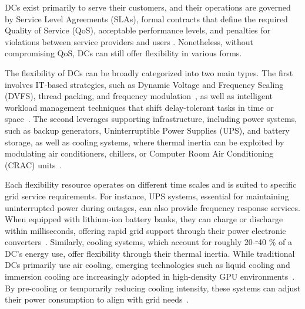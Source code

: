 \documentclass[preprint,12pt]{elsarticle}
\makeatletter
\providecommand{\DIFdeltex}[1]{{\protect\color{red}\sout{#1}}} %
\providecommand{\DIFdelbegin}{} %
\providecommand{\DIFdelend}{} %
\providecommand{\DIFdel}[1]{\texorpdfstring{\DIFdeltex{#1}}{}} %
\providecommand{\DIFscaledelfig}{0.5}
\newlength{\DIFdelgraphicswidth} %
\newlength{\DIFdelgraphicsheight} %
\providecommand{\DIFdelincludegraphics}[2][]{%
\sbox{\DIFdelgraphicsbox}{\DIFOincludegraphics[#1]{#2}}%
\settoboxwidth{\DIFdelgraphicswidth}{\DIFdelgraphicsbox} %
\settoboxtotalheight{\DIFdelgraphicsheight}{\DIFdelgraphicsbox} %
\scalebox{\DIFscaledelfig}{%
\parbox[b]{\DIFdelgraphicswidth}{\usebox{\DIFdelgraphicsbox}\\[-\baselineskip] \rule{\DIFdelgraphicswidth}{0em}}\llap{\resizebox{\DIFdelgraphicswidth}{\DIFdelgraphicsheight}{%
\setlength{\unitlength}{\DIFdelgraphicswidth}%
\begin{picture}(1,1)%
\thicklines\linethickness{2pt} %
{\color[rgb]{1,0,0}\put(0,0){\framebox(1,1){}}}%
{\color[rgb]{1,0,0}\put(0,0){\line( 1,1){1}}}%
{\color[rgb]{1,0,0}\put(0,1){\line(1,-1){1}}}%
\end{picture}%
}\hspace*{3pt}}} %
} %
\DeclareRobustCommand{\DIFdelbegin}{\DIFOdelbegin \let\includegraphics\DIFdelincludegraphics} %
\DeclareRobustCommand{\DIFdelend}{\DIFOaddend \let\includegraphics\DIFOincludegraphics} %
\let\sout@orig\sout %
\renewcommand{\sout}[1]{\ifmmode\text{\sout@orig{\ensuremath{#1}}}\else\sout@orig{#1}\fi} %
\makeatother
\begin{document}
DCs exist primarily to serve their customers, and their operations are governed by Service Level Agreements (SLAs), formal contracts that define the required Quality of Service (QoS), acceptable performance levels, and penalties for violations between service providers and users \cite{arshad2022utilizing}. Nonetheless, without compromising QoS, DCs can still offer flexibility in various forms. 


The flexibility of DCs can be broadly categorized into two main types. The first involves IT-based strategies, such as Dynamic Voltage and Frequency Scaling (DVFS), thread packing, and frequency modulation~\cite{ZHANG2024DR}, as well as intelligent workload management techniques that shift delay-tolerant tasks in time or space~\cite{LIU2013770}. The second leverages supporting infrastructure, including power systems, such as backup generators, Uninterruptible Power Supplies (UPS), and battery storage, as well as cooling systems, where thermal inertia can be exploited by modulating air conditioners, chillers, or Computer Room Air Conditioning (CRAC) units~\cite{Takci2025}.

Each flexibility resource operates on different time scales and is suited to specific grid service requirements. For instance, UPS systems, essential for maintaining uninterrupted power during outages, can also provide frequency response services. When equipped with lithium-ion battery banks, they can charge or discharge within milliseconds, offering rapid grid support through their power electronic converters~\cite{Alapera2019,tomaszewska2019lithium}. Similarly, cooling systems, which account for roughly 20-\DIFdelbegin \DIFdel{-}\DIFdelend 40 \% of a DC's energy use, offer flexibility through their thermal inertia. While traditional DCs primarily use air cooling, emerging technologies such as liquid cooling and immersion cooling are increasingly adopted in high-density GPU environments~\cite{crozier2025potential}. By pre-cooling or temporarily reducing cooling intensity, these systems can adjust their power consumption to align with grid needs~\cite{Cui2024, JerezMonsalves2023}.
\end{document}
